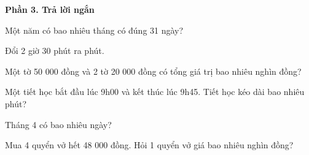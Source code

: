 \textbf{Phần 3. Trả lời ngắn}

\begin{ex} %
Một năm có bao nhiêu tháng có đúng 31 ngày?
\end{ex}

\begin{ex} %
Đổi 2 giờ 30 phút ra phút.
\end{ex}

\begin{ex} %
Một tờ 50 000 đồng và 2 tờ 20 000 đồng có tổng giá trị bao nhiêu nghìn đồng?
\end{ex}

\begin{ex} %
Một tiết học bắt đầu lúc 9h00 và kết thúc lúc 9h45. Tiết học kéo dài bao nhiêu phút?
\end{ex}

\begin{ex} %
Tháng 4 có bao nhiêu ngày?
\end{ex}

\begin{ex} %
Mua 4 quyển vở hết 48 000 đồng. Hỏi 1 quyển vở giá bao nhiêu nghìn đồng?
\end{ex}
